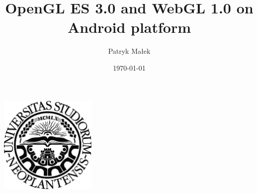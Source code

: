 \documentclass[a4paper,11pt]{article}
\begin{document}
\label{Title} 
\title{OpenGL ES 3.0 and WebGL 1.0 on Android platform \vspace{1pc}}
\author{Patryk Małek \vspace{-0.7pc}}
\date{\today}         %
\maketitle
\thispagestyle{empty}


\vspace{5pc}
\centerline{
\includegraphics[width=0.35\textwidth,height=0.35\textheight,keepaspectratio]{NoviSadLogoGray.jpg}
}
\vspace{9pc}
\end{document}

